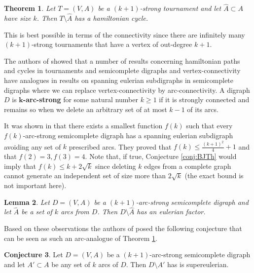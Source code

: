 \documentclass{article}
\newcommand{\2}{\vspace{2mm}}
\theoremstyle{plain}
\newtheorem{theorem}{Theorem}
\newtheorem{lemma}[theorem]{Lemma}
\theoremstyle{definition}
\newtheorem{conjecture}[theorem]{Conjecture}
\begin{document}
\begin{theorem}\cite{fraisseGC3}
 \label{thm:FrTh}
  Let $T=(V,A)$ be a $(k+1)$-strong tournament and let $\hat{A}\subset A$ have size $k$. Then $T\setminus \hat{A}$ has a hamiltonian cycle.
  \end{theorem}

  This is best possible in terms of the connectivity since there are infinitely many $(k+1)$-strong tournaments that have a vertex of out-degree $k+1$.



  The authors of \cite{bangsupereuler} showed that a number of results concerning hamiltonian paths and cycles in tournaments and semicomplete digraphs and  vertex-connectivity have analogues in results on spanning eulerian subdigraphs in semicomplete digraphs where we can replace vertex-connectivity by  arc-connectivity. A digraph $D$ is {\bf $\mathbf{k}$-arc-strong} for some natural number $k\geq 1$ if it  is strongly connected and remains so when we delete an arbitrary set of at most $k-1$ of its arcs.
  

  It was shown in \cite{bangsupereuler} that there exists a smallest function $f(k)$ such that every
  $f(k)$-arc-strong semicomplete digraph has a spanning eulerian subdigraph avoiding any set of $k$ prescribed arcs. They proved that $f(k)\leq \frac{(k+1)^2}{4}+1$ and that $f(2)=3, f(3)=4$.
Note that, if true, Conjecture \ref{conj:BJTh} would imply that $f(k)\leq k+2\sqrt{k}$ since deleting $k$ edges from a complete graph cannot generate an independent set of size more than $2\sqrt{k}$ (the exact bound is not important here).

\begin{lemma}\cite{bangsupereuler}
  \label{lem:factoravoidk}
  Let $D=(V,A)$ be a $(k+1)$-arc-strong semicomplete digraph and let $\hat{A}$ be a set of $k$ arcs from $D$. Then $D\setminus \hat{A}$ has an eulerian factor.\
  \end{lemma}
 
  Based on these observations the authors of \cite{bangsupereuler} posed the following conjecture that can be seen as such an arc-analogue of Theorem \ref{thm:FrTh}.
\begin{conjecture}
    \label{conj:euleravoid}
    Let $D=(V,A)$ be a $(k+1)$-arc-strong semicomplete digraph and let $A'\subset A$ be any set of $k$ arcs of $D$. Then $D\setminus A'$ has is supereulerian.
  \end{conjecture}
  
\end{document}
